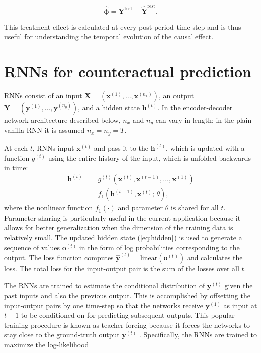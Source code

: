 \documentclass[hidelinks,12pt]{article}
\begin{document}
\begin{equation}\label{eq:pointwise}
  \boldsymbol{\hat{\phi}} = \boldsymbol{Y}^{\text{test}} - \boldsymbol{\hat{Y}}^{\text{test}}. 
\end{equation}

This treatment effect is calculated at every post-period time-step and is thus useful for understanding the temporal evolution of the causal effect.

\section{RNNs for counteractual prediction} \label{RNNs-section}

RNNs \citep{graves2012,goodfellow2016deep} consist of an input $\boldsymbol{X} = \left(\boldsymbol{x}^{(1)}, \ldots, \boldsymbol{x}^{(n_x)}\right)$, an output $\boldsymbol{Y} = \left(\boldsymbol{y}^{(1)}, \ldots, \boldsymbol{y}^{(n_y)}\right)$, and a hidden state $\boldsymbol{h}^{(t)}$. In the encoder-decoder network architecture described below, $n_x$ and $n_y$ can vary in length; in the plain vanilla RNN it is assumed $n_x = n_y = T$.  

At each $t$, RNNs input $\boldsymbol{x}^{(t)}$ and pass it to the $\boldsymbol{h}^{(t)}$, which is updated with a function $g^{(t)}$ using the entire history of the input, which is unfolded backwards in time:
%
\begin{align}
\boldsymbol{h}^{(t)} &= g^{(t)} \left(\boldsymbol{x}^{(t)}, \boldsymbol{x}^{(t-1)}, \ldots, \boldsymbol{x}^{(1)} \right) \nonumber \\ 
&= f_1 \left( \boldsymbol{h}^{(t-1)}, \boldsymbol{x}^{(t)}; \, \theta \right), \label{eq:hidden}
\end{align} where the nonlinear function $f_1(\cdot)$ and parameter $\theta$ is shared for all $t$. Parameter sharing is particularly useful in the current application because it allows for better generalization when the dimension of the training data is relatively small. The updated hidden state (\ref{eq:hidden}) is used to generate a sequence of values $\boldsymbol{o}^{(t)}$ in the form of log probabilities corresponding to the output. The loss function computes $\boldsymbol{\hat{y}}^{(t)} = \mathrm{linear} (\boldsymbol{o}^{(t)})$ and calculates the loss. The total loss for the input-output pair is the sum of the losses over all $t$.

The RNNs are trained to estimate the conditional distribution of $\boldsymbol{y}^{(t)}$ given the past inputs and also the previous output. This is accomplished by offsetting the input-output pairs by one time-step so that the networks receive $\boldsymbol{y}^{(1)}$  as input at $t + 1$ to be conditioned on for predicting subsequent outputs. This popular training procedure is known as teacher forcing because it forces the networks to stay close to the ground-truth output $\boldsymbol{y}^{(t)}$ \citep{lamb2016professor}. Specifically, the RNNs are trained to maximize the log-likelihood
\end{document}
